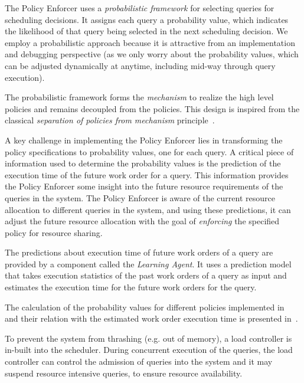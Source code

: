 The Policy Enforcer uses a \textit{probabilistic framework} for selecting queries for scheduling decisions. It assigns each query a probability value, which indicates the likelihood of that query being selected in the next scheduling decision. %
We employ a probabilistic approach because it is attractive from an implementation and debugging perspective (as we only worry about the probability values, which can be adjusted dynamically at anytime, including mid-way through query execution).

The probabilistic framework forms the \textit{mechanism} to realize the high level policies and remains decoupled from the policies.
This design is inspired from the classical \textit{separation of policies from mechanism} principle~\cite{LampsonS76}.

A key challenge in implementing the Policy Enforcer lies in transforming the policy specifications to probability values, one for each query.
A critical piece of information used to determine the probability values is the prediction of the execution time of the future work order for a query.
This information provides the Policy Enforcer some insight into the future resource requirements of the queries in the system.
The Policy Enforcer is aware of the current resource allocation to different queries in the system, and using these predictions, it can adjust the future resource allocation with the goal of \textit{enforcing} the specified policy for resource sharing.

The predictions about execution time of future work orders of a query are provided by a component called the \textit{Learning Agent}.
It uses a prediction model that takes execution statistics of the past work orders of a query as input and estimates the execution time for the future work orders for the query.

The calculation of the probability values for different policies implemented in \Quickstep\, and their relation with the estimated work order execution time is presented in~\cite{scheduler}.

To prevent the system from thrashing (e.g. out of memory), a load controller is in-built into the scheduler.
During concurrent execution of the queries, the load controller can control the admission of queries into the system and it may suspend resource intensive queries, to ensure resource availability.

